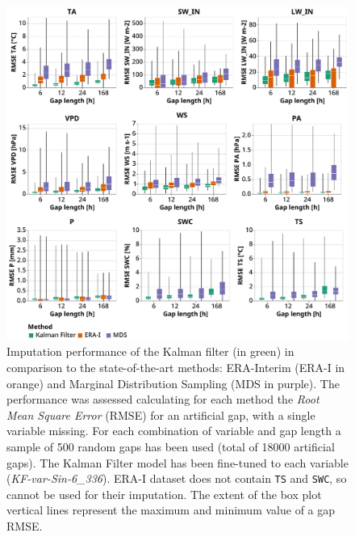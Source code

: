 \documentclass{article}
\newcommand{\imgwidth}{6in}
\begin{document}
\begin{figure}
    \centerline{\includegraphics[width=\imgwidth]{the_plot}}
\caption{ Imputation performance of the Kalman filter (in green) in comparison to the state-of-the-art methods: ERA-Interim (ERA-I in orange) and Marginal Distribution Sampling (MDS in purple). The performance was assessed calculating for each method the \textit{Root Mean Square Error} (RMSE) for an artificial gap, with a single variable missing. For each combination of variable and gap length a sample of 500 random gaps has been used (total of 18000 artificial gaps).
The Kalman Filter model has been fine-tuned to each variable (\textit{KF-\textlangle var\textrangle-Sin-6\_336}). ERA-I dataset does not contain \texttt{TS} and \texttt{SWC}, so cannot be used for their imputation. The extent of the box plot vertical lines represent the maximum and minimum value of a gap RMSE.}
\label{fig:the_plot}
\end{figure}

\newcommand{\CapTheTable}{Imputation performance of the Kalman filter in comparison to the state-of-the-art
methods: ERA-Interim (ERA-I) and Marginal Distribution Sampling (MDS), using mean and standard deviation of the \textit{Root Mean Square Error} (RMSE). The best method for each gap length is highlighted in bold.}

\end{document}
